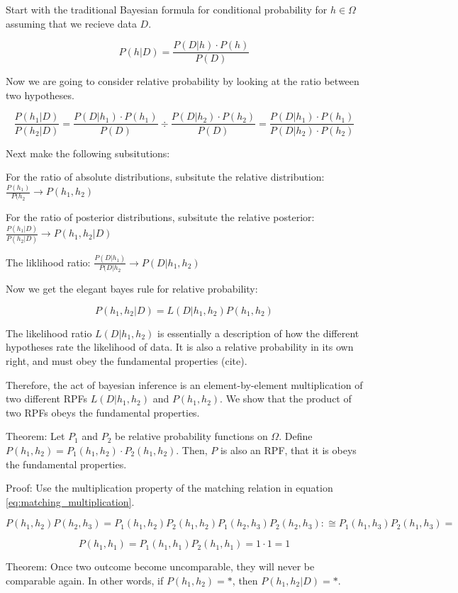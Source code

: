 \documentclass[twoside]{article}
\begin{document}
Start with the traditional Bayesian formula for conditional probability for \(h \in \Omega\) assuming that we recieve data \(D\).

\[P(h|D) = \frac{P(D|h) \cdot P(h)}{P(D)}\]

Now we are going to consider relative probability by looking at the ratio between two hypotheses.

\[\frac{P(h_1|D)}{P(h_2| D)} = \frac{P(D|h_1) \cdot P(h_1)}{P(D)} \div \frac{P(D|h_2) \cdot P(h_2)}{P(D)} = \frac{P(D|h_1) \cdot P(h_1)}{P(D|h_2) \cdot P(h_2)} \]

Next make the following subsitutions:

For the ratio of absolute distributions, subsitute the relative distribution: \(\frac{P(h_1)}{P(h_2} \rightarrow P(h_1, h_2) \)

For the ratio of posterior distributions, subsitute the relative posterior: \(\frac{P(h_1|D)}{P(h_2|D)} \rightarrow P(h_1, h_2|D) \)

The liklihood ratio: \(\frac{P(D|h_1)}{P(D|h_2} \rightarrow P(D|h_1, h_2) \)

Now we get the elegant bayes rule for relative probability:

 \[P(h_1, h_2|D) = L(D|h_1, h_2) P(h_1, h_2)\]
 
 The likelihood ratio \(L(D|h_1, h_2)\) is essentially a description of how the different hypotheses rate the likelihood of data. It is also a relative probability in its own right, and must obey the fundamental properties (cite).
 
 Therefore, the act of bayesian inference is an element-by-element multiplication of two different RPFs \(L(D|h_1, h_2)\) and \(P(h_1, h_2)\). We show that the product of two RPFs obeys the fundamental properties.
 
 Theorem: Let \(P_1\) and \(P_2\) be relative probability functions on \(\Omega\). Define \(P(h_1, h_2) = P_1(h_1, h_2) \cdot P_2(h_1, h_2)\). Then, \(P\) is also an RPF, that it is obeys the fundamental properties.
 
 Proof: Use the multiplication property of the matching relation in equation \ref{eq:matching_multiplication}.
 
 \[P(h_1, h_2)P(h_2, h_3)=P_1(h_1, h_2) P_2(h_1, h_2)P_1(h_2, h_3) P_2(h_2, h_3) :\cong P_1(h_1, h_3) P_2(h_1, h_3)=\]

\[P(h_1, h_1) = P_1(h_1, h_1) P_2(h_1, h_1)=1 \cdot 1=1\]

Theorem: Once two outcome become uncomparable, they will never be comparable again. In other words, if \(P(h_1, h_2)=\ast\), then \(P(h_1, h_2|D) = \ast\).
\end{document}
